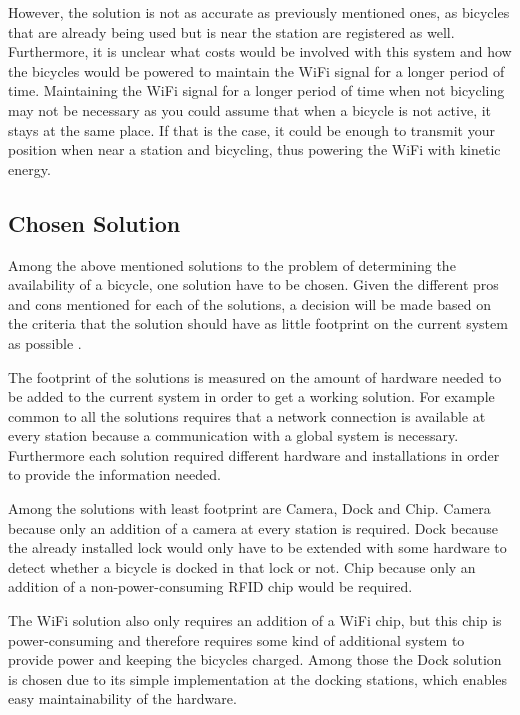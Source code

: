 However, the solution is not as accurate as previously mentioned ones, as bicycles that are already being used but is near the station are registered as well.
Furthermore, it is unclear what costs would be involved with this system and how the bicycles would be powered to maintain the WiFi signal for a longer period of time. 
Maintaining the WiFi signal for a longer period of time when not bicycling may not be necessary as you could assume that when a bicycle is not active, it stays at the same place.
If that is the case, it could be enough to transmit your position when near a station and bicycling, thus powering the WiFi with kinetic energy.

\subsection{Chosen Solution}
Among the above mentioned solutions to the problem of determining the availability of a bicycle, one solution have to be chosen. 
Given the different pros and cons mentioned for each of the solutions, a decision will be made based on the criteria that the solution should have as little footprint on the current system as possible . 

The footprint of the solutions is measured on the amount of hardware needed to be added to the current system in order to get a working solution. 
For example common to all the solutions requires that a network connection is available at every station because a communication with a global system is necessary. 
Furthermore each solution required different hardware and installations in order to provide the information needed. 

Among the solutions with least footprint are Camera, Dock and Chip. 
Camera because only an addition of a camera at every station is required. 
Dock because the already installed lock would only have to be extended with some hardware to detect whether a bicycle is docked in that lock or not.
Chip because only an addition of a non-power-consuming RFID chip would be required.

The WiFi solution also only requires an addition of a WiFi chip, but this chip is power-consuming and therefore requires some kind of additional system to provide power and keeping the bicycles charged.
Among those the Dock solution is chosen due to its simple implementation at the docking stations, which enables easy maintainability of the hardware. 

